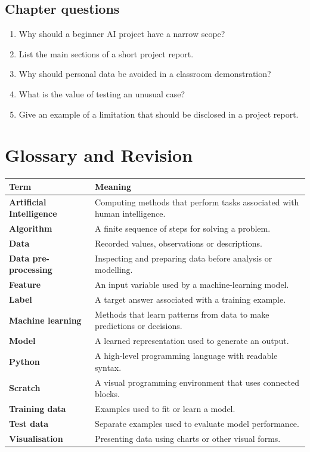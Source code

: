 \documentclass[11pt,openany,oneside]{book}
\begin{document}
\section{Chapter questions}
\begin{enumerate}
\item Why should a beginner AI project have a narrow scope?
\item List the main sections of a short project report.
\item Why should personal data be avoided in a classroom demonstration?
\item What is the value of testing an unusual case?
\item Give an example of a limitation that should be disclosed in a project report.
\end{enumerate}

\chapter{Glossary and Revision}
\begin{longtable}{>{\bfseries}p{} p{}}
\toprule
Term & Meaning\\
\midrule
Artificial Intelligence & Computing methods that perform tasks associated with human intelligence.\\
Algorithm & A finite sequence of steps for solving a problem.\\
Data & Recorded values, observations or descriptions.\\
Data pre-processing & Inspecting and preparing data before analysis or modelling.\\
Feature & An input variable used by a machine-learning model.\\
Label & A target answer associated with a training example.\\
Machine learning & Methods that learn patterns from data to make predictions or decisions.\\
Model & A learned representation used to generate an output.\\
Python & A high-level programming language with readable syntax.\\
Scratch & A visual programming environment that uses connected blocks.\\
Training data & Examples used to fit or learn a model.\\
Test data & Separate examples used to evaluate model performance.\\
Visualisation & Presenting data using charts or other visual forms.\\
\bottomrule
\end{longtable}
\end{document}
